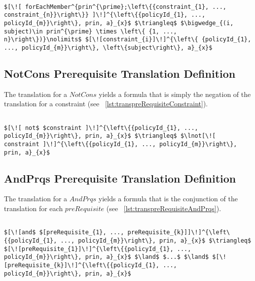 \lstset{mathescape, language=AST}  
\begin{lstlisting}[frame=single, caption={Prerequisite Translation Definition {$\colon$} ForEachMember},label={lst:transpreRequisiteForEachMember}]

$[\![ forEachMember^{prin^{\prime};\left\{{constraint_{1}, ..., constraint_{n}}\right\}} ]\!]^{\left\{{policyId_{1}, ..., policyId_{m}}\right\}, prin, a}_{x}$ $\triangleq$ $\bigwedge_{(i, subject)\in prin^{\prime} \times \left\{ {1, ..., n}\right\})}\nolimits$ $[\![constraint_{i}]\!]^{\left\{ {policyId_{1}, ..., policyId_{m}}\right\}, \left\{subject\right\}, a}_{x}$
\end{lstlisting}



\subsection{NotCons Prerequisite Translation Definition}
The translation for a $NotCons$ yields a formula that is simply the negation of the translation for a constraint (see ~\ref{lst:transpreRequisiteConstraint}).

\lstset{mathescape, language=AST}  
\begin{lstlisting}[frame=single, caption={Prerequisite Translation Definition {$\colon$} Not Constraint},label={lst:transpreRequisiteNotConstraint}]

$[\![ not$ $constraint ]\!]^{\left\{{policyId_{1}, ..., policyId_{m}}\right\}, prin, a}_{x}$ $\triangleq$ $\lnot[\![ constraint ]\!]^{\left\{{policyId_{1}, ..., policyId_{m}}\right\}, prin, a}_{x}$ 
\end{lstlisting}

\subsection{AndPrqs Prerequisite Translation Definition}
The translation for a $AndPrqs$ yields a formula that is the conjunction of the translation for each $preRequisite$ (see ~\ref{lst:transpreRequisiteAndPrqs}).

\lstset{mathescape, language=AST}  
\begin{lstlisting}[frame=single, caption={Prerequisite Translation Definition {$\colon$} Conjunction },label={lst:transpreRequisiteAndPrqs}]

$[\![and$ $[preRequisite_{1}, ..., preRequisite_{k}]]\!]^{\left\{{policyId_{1}, ..., policyId_{m}}\right\}, prin, a}_{x}$ $\triangleq$ $[\![preRequisite_{1}]\!]^{\left\{{policyId_{1}, ..., policyId_{m}}\right\}, prin, a}_{x}$ $\land$ $...$ $\land$ $[\![preRequisite_{k}]\!]^{\left\{{policyId_{1}, ..., policyId_{m}}\right\}, prin, a}_{x}$

\end{lstlisting}

